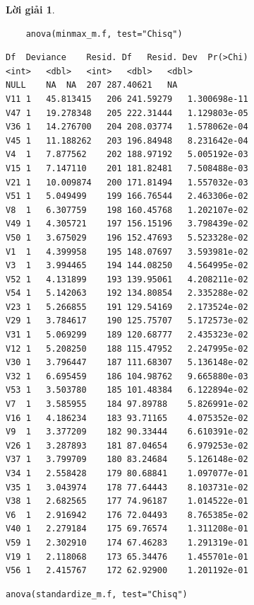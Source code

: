 \documentclass[14pt, a4paper]{article}
\theoremstyle{sltheorem}
\theoremstyle{soltheorem}
\newtheorem*{loigiai}{Lời giải}
\begin{document}
\begin{loigiai}
\begin{verbatim}
    anova(minmax_m.f, test="Chisq")
\end{verbatim}

    \begin{verbatim}
Df	Deviance	Resid. Df	Resid. Dev	Pr(>Chi)
<int>	<dbl>	<int>	<dbl>	<dbl>
NULL	NA	NA	207	287.40621	NA
V11	1	45.813415	206	241.59279	1.300698e-11
V47	1	19.278348	205	222.31444	1.129803e-05
V36	1	14.276700	204	208.03774	1.578062e-04
V45	1	11.188262	203	196.84948	8.231642e-04
V4	1	7.877562	202	188.97192	5.005192e-03
V15	1	7.147110	201	181.82481	7.508488e-03
V21	1	10.009874	200	171.81494	1.557032e-03
V51	1	5.049499	199	166.76544	2.463306e-02
V8	1	6.307759	198	160.45768	1.202107e-02
V49	1	4.305721	197	156.15196	3.798439e-02
V50	1	3.675029	196	152.47693	5.523328e-02
V1	1	4.399958	195	148.07697	3.593981e-02
V3	1	3.994465	194	144.08250	4.564995e-02
V52	1	4.131899	193	139.95061	4.208211e-02
V54	1	5.142063	192	134.80854	2.335288e-02
V23	1	5.266855	191	129.54169	2.173524e-02
V29	1	3.784617	190	125.75707	5.172573e-02
V31	1	5.069299	189	120.68777	2.435323e-02
V12	1	5.208250	188	115.47952	2.247995e-02
V30	1	3.796447	187	111.68307	5.136148e-02
V32	1	6.695459	186	104.98762	9.665880e-03
V53	1	3.503780	185	101.48384	6.122894e-02
V7	1	3.585955	184	97.89788	5.826991e-02
V16	1	4.186234	183	93.71165	4.075352e-02
V9	1	3.377209	182	90.33444	6.610391e-02
V26	1	3.287893	181	87.04654	6.979253e-02
V37	1	3.799709	180	83.24684	5.126148e-02
V34	1	2.558428	179	80.68841	1.097077e-01
V35	1	3.043974	178	77.64443	8.103731e-02
V38	1	2.682565	177	74.96187	1.014522e-01
V6	1	2.916942	176	72.04493	8.765385e-02
V40	1	2.279184	175	69.76574	1.311208e-01
V59	1	2.302910	174	67.46283	1.291319e-01
V19	1	2.118068	173	65.34476	1.455701e-01
V56	1	2.415767	172	62.92900	1.201192e-01
    \end{verbatim}

    \begin{verbatim}
anova(standardize_m.f, test="Chisq")
    \end{verbatim}


\end{loigiai}
\end{document}
